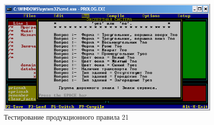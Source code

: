 \begin{figure}[H]
	\centering
	\includegraphics{fig/screen4}
	\caption{Тестирование продукционного правила 21}
	\label{fig:screen4}
\end{figure}
